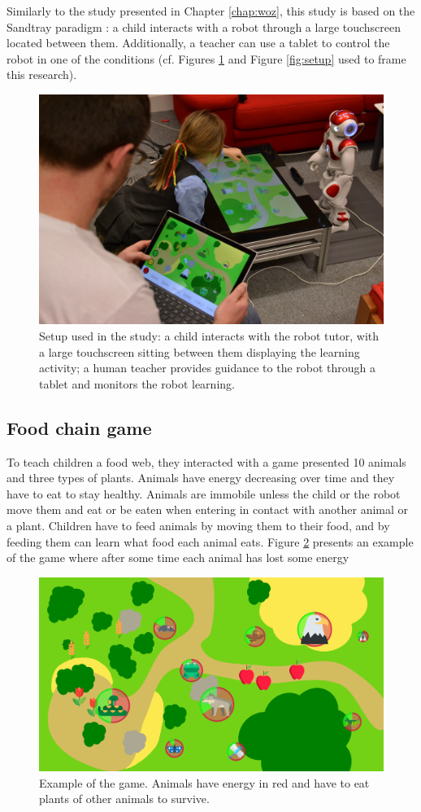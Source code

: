 Similarly to the study presented in Chapter \ref{chap:woz}, this study is based on the Sandtray paradigm \citep{baxter2012touchscreen}: a child interacts with a robot through a large touchscreen located between them. Additionally, a teacher can use a tablet to control the robot in one of the conditions (cf. Figures \ref{fig:education_setup} and Figure \ref{fig:setup} used to frame this research).

\begin{figure}[ht]
	\centering
	\includegraphics[width=.5\textwidth]{setup.jpg}
	\caption{Setup used in the study: a child interacts with the robot tutor, with a large touchscreen sitting between them displaying the learning activity; a human teacher provides guidance to the robot through a tablet and monitors the robot learning.}
	\label{fig:education_setup}
\end{figure}



\subsection{Food chain game}
To teach children a food web, they interacted with a game presented 10 animals and three types of plants. Animals have energy decreasing over time and they have to eat to stay healthy. Animals are immobile unless the child or the robot move them and eat or be eaten when entering in contact with another animal or a plant. Children have to feed animals by moving them to their food, and by feeding them can learn what food each animal eats. Figure \ref{fig:education_game} presents an example of the game where after some time each animal has lost some energy

\begin{figure}[ht]
	\centering
		\includegraphics[width=1\textwidth]{game.png}
		\captionsetup{width=.9\linewidth}
		\caption{Example of the game. Animals have energy in red and have to eat plants of other animals to survive.}
		\label{fig:education_game}
\end{figure}

